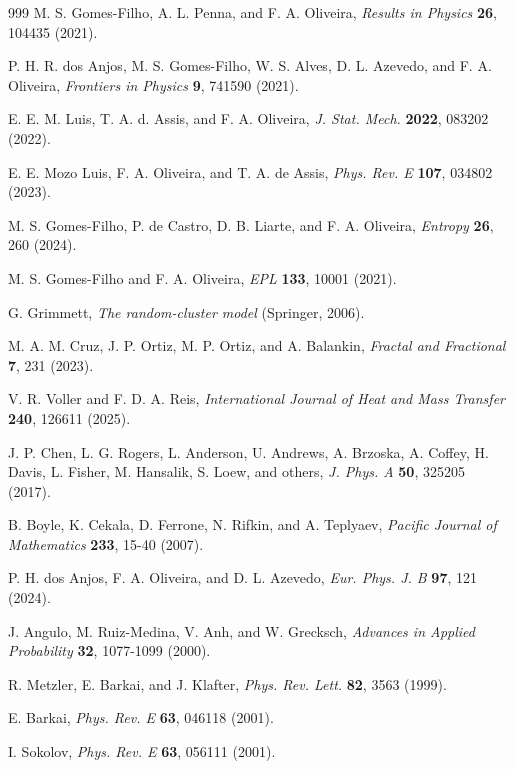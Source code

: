 \documentclass[pre,aps,twocolumn,showpacs,floatfix,nofootinbib,superscriptaddress,linenumbers]{revtex4-1}
\begin{document}
\begin{thebibliography}{999}
 M. S. Gomes-Filho, A. L. Penna, and F. A. Oliveira, \textit{Results in Physics} \textbf{26}, 104435 (2021).

 P. H. R. dos Anjos, M. S. Gomes-Filho, W. S. Alves, D. L. Azevedo, and F. A. Oliveira, \textit{Frontiers in Physics} \textbf{9}, 741590 (2021).

 E. E. M. Luis, T. A. d. Assis, and F. A. Oliveira, \textit{J. Stat. Mech.} \textbf{2022}, 083202 (2022).

 E. E. Mozo Luis, F. A. Oliveira, and T. A. de Assis, \textit{Phys. Rev. E} \textbf{107}, 034802 (2023).

 M. S. Gomes-Filho, P. de Castro, D. B. Liarte, and F. A. Oliveira, \textit{Entropy} \textbf{26}, 260 (2024).

 M. S. Gomes-Filho and F. A. Oliveira, \textit{EPL} \textbf{133}, 10001 (2021).

 G. Grimmett, \textit{The random-cluster model} (Springer, 2006).

 M. A. M. Cruz, J. P. Ortiz, M. P. Ortiz, and A. Balankin, \textit{Fractal and Fractional} \textbf{7}, 231 (2023).

 V. R. Voller and F. D. A. Reis, \textit{International Journal of Heat and Mass Transfer} \textbf{240}, 126611 (2025).

 J. P. Chen, L. G. Rogers, L. Anderson, U. Andrews, A. Brzoska, A. Coffey, H. Davis, L. Fisher, M. Hansalik, S. Loew, and others, \textit{J. Phys. A} \textbf{50}, 325205 (2017).

 B. Boyle, K. Cekala, D. Ferrone, N. Rifkin, and A. Teplyaev, \textit{Pacific Journal of Mathematics} \textbf{233}, 15-40 (2007).

 P. H. dos Anjos, F. A. Oliveira, and D. L. Azevedo, \textit{Eur. Phys. J. B} \textbf{97}, 121 (2024).

 J. Angulo, M. Ruiz-Medina, V. Anh, and W. Grecksch, \textit{Advances in Applied Probability} \textbf{32}, 1077-1099 (2000).

 R. Metzler, E. Barkai, and J. Klafter, \textit{Phys. Rev. Lett.} \textbf{82}, 3563 (1999).

 E. Barkai, \textit{Phys. Rev. E} \textbf{63}, 046118 (2001).

 I. Sokolov, \textit{Phys. Rev. E} \textbf{63}, 056111 (2001).


\end{thebibliography}
\end{document}
